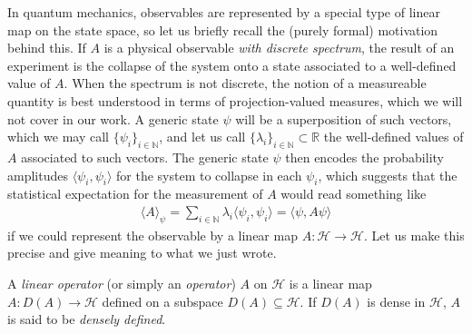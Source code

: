 
In quantum mechanics, observables are represented by a special type of linear map on the state
space, so let us briefly recall the (purely formal) motivation behind this. If $A$ is a
physical observable \textit{with discrete spectrum}, the result of an experiment is the
collapse of the system onto a state associated to a well-defined value of $A$.
When the spectrum is not discrete, the notion of a measureable quantity is best understood in
terms of projection-valued measures, which we will not cover in our work. A generic state
$\psi$ will be a superposition of such vectors, which we may call $\{\psi_i\}_{i\in\mathbb{N}}$,
and let us call $\{\lambda_i\}_{i\in\mathbb{N}}\subset\mathbb{R}$ the well-defined values of
$A$ associated to such vectors. The generic state $\psi$ then encodes the probability
amplitudes $\langle\psi_i,\psi_i\rangle$ for the system to collapse in each $\psi_i$, which
suggests that the statistical expectation for the measurement of $A$ would read something like
\begin{align*}
	\langle A\rangle_\psi=\sum_{i\in\mathbb{N}}\lambda_i\langle\psi_i,\psi_i\rangle=\langle\psi,A\psi\rangle
\end{align*}
if we could represent the observable by a linear map $A:\mathcal{H}\to\mathcal{H}$. Let us
make this precise and give meaning to what we just wrote.

\begin{definition}[Operator]
	A \textit{linear operator} (or simply an \textit{operator}) $A$ on $\mathcal{H}$ is a
	linear map $A:D(A)\to\mathcal{H}$ defined on a subspace $D(A)\subseteq\mathcal{H}$. If
	$D(A)$ is dense in $\mathcal{H}$, $A$ is said to be \textit{densely defined}.
\end{definition}

